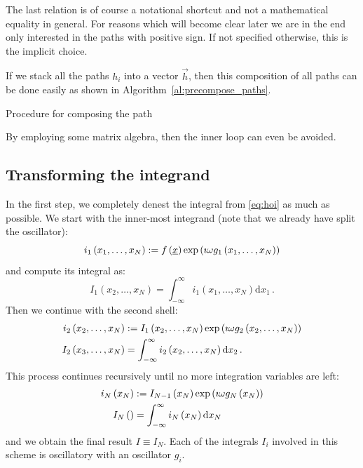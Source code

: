 \documentclass[a4paper,10pt]{article}
\begin{document}
The last relation is of course a notational shortcut and
not a mathematical equality in general. For reasons which
will become clear later we are in the end only interested
in the paths with positive sign. If not specified otherwise,
this is the implicit choice.

If we stack all the paths $h_i$ into a vector $\vec{h}$, then
this composition of all paths can be done easily as shown
in Algorithm~\ref{al:precompose_paths}.
\begin{algorithm}
  \caption{Procedure for composing the path}
  \label{al:precompose_paths}
  \begin{algorithmic}
      \EndFor
    \EndFor
  \end{algorithmic}
\end{algorithm}
By employing some matrix algebra, then the inner loop
can even be avoided.


\subsection{Transforming the integrand}


In the first step, we completely denest the integral from
\eqref{eq:hoi} as much as possible.
We start with the inner-most integrand (note that we already
have split the oscillator):
\begin{equation}
  i_1\left(x_1,\ldots,x_N\right) := f\left(\underline{x}\right) \exp\left(\imath \omega g_1\left(x_1,\ldots,x_N\right)\right)
\end{equation}
and compute its integral as:
\begin{equation}
  I_1\left(x_2,\ldots,x_N\right) = \int_{-\infty}^\infty i_1\left(x_1,\ldots,x_N\right) \mathrm{d}x_1 \,.
\end{equation}
Then we continue with the second shell:
\begin{equation}
\begin{split}
  i_2\left(x_2,\ldots,x_N\right) & := I_1\left(x_2,\ldots,x_N\right) \exp\left(\imath \omega g_2\left(x_2,\ldots,x_N\right)\right) \\
  I_2\left(x_3,\ldots,x_N\right) & = \int_{-\infty}^\infty i_2\left(x_2,\ldots,x_N\right) \mathrm{d}x_2 \,.
\end{split}
\end{equation}
This process continues recursively until no more integration
variables are left:
\begin{equation}
\begin{split}
  i_N\left(x_N\right) & := I_{N-1}\left(x_N\right) \exp\left(\imath \omega g_N\left(x_N\right)\right) \\
  I_N\left(\right)    & = \int_{-\infty}^\infty i_N\left(x_N\right) \mathrm{d}x_N
\end{split}
\end{equation}
and we obtain the final result $I \equiv I_N$. Each of the integrals $I_i$
involved in this scheme is oscillatory with an oscillator $g_i$.
\end{document}
